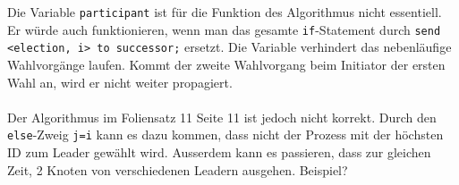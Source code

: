 Die Variable \verb+participant+ ist für die Funktion des Algorithmus nicht
essentiell. Er würde auch funktionieren, wenn man das gesamte
\verb+if+-Statement durch \verb+send <election, i> to successor;+ ersetzt.
Die Variable verhindert das nebenläufige Wahlvorgänge laufen. Kommt der zweite
Wahlvorgang beim Initiator der ersten Wahl an, wird er nicht weiter propagiert.
\\ \\
Der Algorithmus im Foliensatz 11 Seite 11 ist jedoch nicht korrekt. Durch den
\verb+else+-Zweig \verb+j=i+ kann es dazu kommen, dass nicht der Prozess mit der
höchsten ID zum Leader gewählt wird. Ausserdem kann es passieren, dass zur
gleichen Zeit, 2 Knoten von verschiedenen Leadern ausgehen.
Beispiel?
